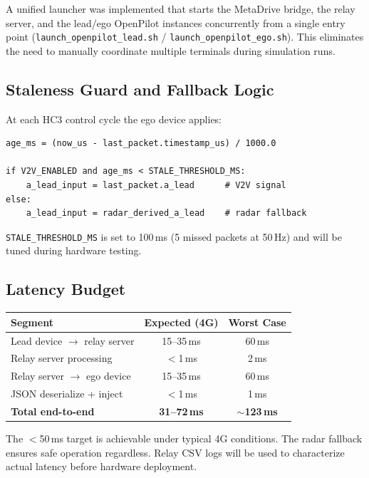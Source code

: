 \documentclass[12pt]{article}
\begin{document}
A unified launcher was implemented that starts the MetaDrive bridge, the relay server, and the lead/ego OpenPilot instances concurrently from a single entry point (\texttt{launch\_openpilot\_lead.sh} / \texttt{launch\_openpilot\_ego.sh}). This eliminates the need to manually coordinate multiple terminals during simulation runs.

\subsection{Staleness Guard and Fallback Logic}

At each HC3 control cycle the ego device applies:

\begin{verbatim}
age_ms = (now_us - last_packet.timestamp_us) / 1000.0

if V2V_ENABLED and age_ms < STALE_THRESHOLD_MS:
    a_lead_input = last_packet.a_lead      # V2V signal
else:
    a_lead_input = radar_derived_a_lead    # radar fallback
\end{verbatim}

\texttt{STALE\_THRESHOLD\_MS} is set to 100\,ms (5 missed packets at 50\,Hz) and will be tuned during hardware testing.

\subsection{Latency Budget}

\begin{center}
\begin{tabular}{lcc}
  \toprule
  \textbf{Segment} & \textbf{Expected (4G)} & \textbf{Worst Case} \\
  \midrule
  Lead device $\to$ relay server & 15--35\,ms & 60\,ms \\
  Relay server processing         & $<$1\,ms   & 2\,ms  \\
  Relay server $\to$ ego device   & 15--35\,ms & 60\,ms \\
  JSON deserialize + inject       & $<$1\,ms   & 1\,ms  \\
  \midrule
  \textbf{Total end-to-end}       & \textbf{31--72\,ms} & \textbf{$\sim$123\,ms} \\
  \bottomrule
\end{tabular}
\end{center}

The $<$50\,ms target is achievable under typical 4G conditions. The radar fallback ensures safe operation regardless. Relay CSV logs will be used to characterize actual latency before hardware deployment.
\end{document}
